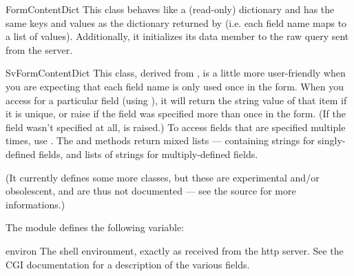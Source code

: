 \begin{funcdesc}{FormContentDict}{}
This class behaves like a (read-only) dictionary and has the same keys
and values as the dictionary returned by  (i.e. each
field name maps to a list of values).  Additionally, it initializes
its data member  to the raw query sent from the
server.
\end{funcdesc}

\begin{funcdesc}{SvFormContentDict}{}
This class, derived from , is a little more
user-friendly when you are expecting that each field name is only used
once in the form.  When you access for a particular field (using
), it will return the string value of that item
if it is unique, or raise  if the field was specified
more than once in the form.  (If the field wasn't specified at all,
 is raised.)  To access fields that are specified
multiple times, use .  The
 and  methods return mixed lists ---
containing strings for singly-defined fields, and lists of strings for
multiply-defined fields.
\end{funcdesc}

(It currently defines some more classes, but these are experimental
and/or obsolescent, and are thus not documented --- see the source for
more informations.)

The module defines the following variable:

\begin{datadesc}{environ}
The shell environment, exactly as received from the http server.  See
the CGI documentation for a description of the various fields.
\end{datadesc}
